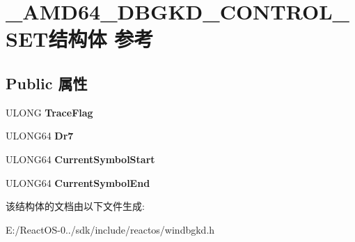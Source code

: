 \hypertarget{struct___a_m_d64___d_b_g_k_d___c_o_n_t_r_o_l___s_e_t}{}\section{\+\_\+\+A\+M\+D64\+\_\+\+D\+B\+G\+K\+D\+\_\+\+C\+O\+N\+T\+R\+O\+L\+\_\+\+S\+E\+T结构体 参考}
\label{struct___a_m_d64___d_b_g_k_d___c_o_n_t_r_o_l___s_e_t}
\subsection*{Public 属性}
\begin{DoxyCompactItemize}
\item 
\mbox{\label{struct___a_m_d64___d_b_g_k_d___c_o_n_t_r_o_l___s_e_t_a6aa832869801b1bb3dc8b2378f3aaeff}} 
U\+L\+O\+NG {\bfseries Trace\+Flag}
\item 
\mbox{\label{struct___a_m_d64___d_b_g_k_d___c_o_n_t_r_o_l___s_e_t_ad6fc5081279d5ca88c499fdfc6b3462c}} 
U\+L\+O\+N\+G64 {\bfseries Dr7}
\item 
\mbox{\label{struct___a_m_d64___d_b_g_k_d___c_o_n_t_r_o_l___s_e_t_a9161da069ea9450f01dfa7108e467539}} 
U\+L\+O\+N\+G64 {\bfseries Current\+Symbol\+Start}
\item 
\mbox{\label{struct___a_m_d64___d_b_g_k_d___c_o_n_t_r_o_l___s_e_t_a173a6ca26faefc774311fd3a483304c6}} 
U\+L\+O\+N\+G64 {\bfseries Current\+Symbol\+End}
\end{DoxyCompactItemize}


该结构体的文档由以下文件生成\+:\begin{DoxyCompactItemize}
\item 
E\+:/\+React\+O\+S-\/0../sdk/include/reactos/windbgkd.\+h\end{DoxyCompactItemize}
